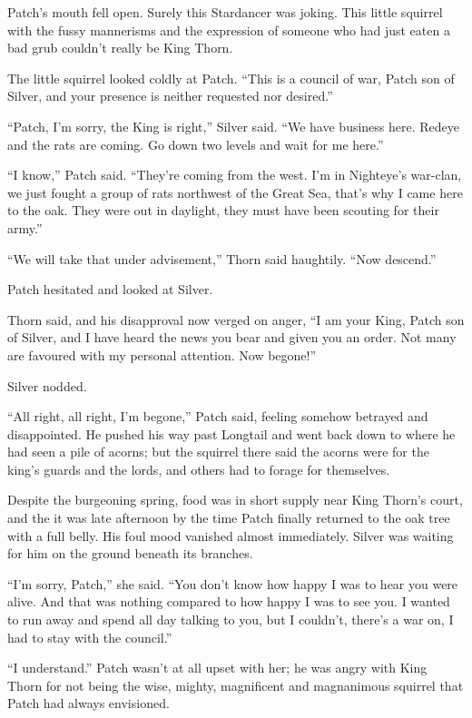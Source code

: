 \documentclass[12pt]{memoir}
\begin{document}
Patch’s mouth fell open. Surely this Stardancer was joking. This
little squirrel with the fussy mannerisms and the expression of
someone who had just eaten a bad grub couldn’t really be King Thorn.

The little squirrel looked coldly at Patch. “This is a council of war,
Patch son of Silver, and your presence is neither requested nor
desired.”

“Patch, I’m sorry, the King is right,” Silver said. “We have business
here. Redeye and the rats are coming. Go down two levels and wait for
me here.”

“I know,” Patch said. “They’re coming from the west. I’m in Nighteye’s
war-clan, we just fought a group of rats northwest of the Great Sea,
that’s why I came here to the oak. They were out in daylight, they
must have been scouting for their army.”

“We will take that under advisement,” Thorn said haughtily. “Now
descend.”

Patch hesitated and looked at Silver.

Thorn said, and his disapproval now verged on anger, “I am your King,
Patch son of Silver, and I have heard the news you bear and given you
an order. Not many are favoured with my personal attention. Now
begone!”

Silver nodded.

“All right, all right, I’m begone,” Patch said, feeling somehow
betrayed and disappointed. He pushed his way past Longtail and went
back down to where he had seen a pile of acorns; but the squirrel
there said the acorns were for the king’s guards and the lords, and
others had to forage for themselves.

Despite the burgeoning spring, food was in short supply near King
Thorn’s court, and the it was late afternoon by the time Patch finally
returned to the oak tree with a full belly. His foul mood vanished
almost immediately. Silver was waiting for him on the ground beneath
its branches.

“I’m sorry, Patch,” she said. “You don’t know how happy I was to hear
you were alive. And that was nothing compared to how happy I was to
see you. I wanted to run away and spend all day talking to you, but I
couldn’t, there’s a war on, I had to stay with the council.”

“I understand.” Patch wasn’t at all upset with her; he was angry with
King Thorn for not being the wise, mighty, magnificent and magnanimous
squirrel that Patch had always envisioned.
\end{document}
